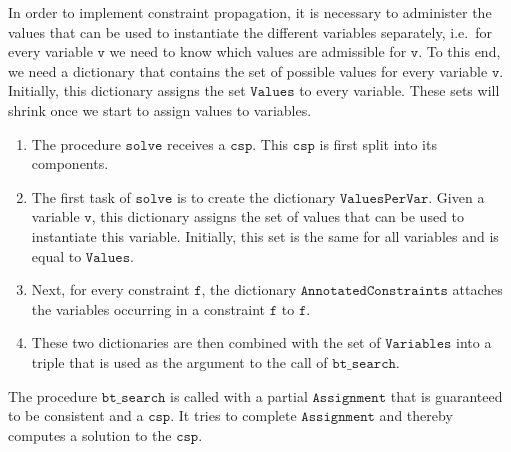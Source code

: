 In order to implement constraint propagation, it is necessary to administer the values that can be used
to instantiate the different variables separately, i.e.~for every variable $\mathtt{v}$ we need to know which
values are admissible for $\mathtt{v}$.  To this end, we need a dictionary that contains the set of possible
values for every variable $\mathtt{v}$.  Initially, this dictionary assigns the set $\mathtt{Values}$ to
every variable.  These sets will shrink once we start to assign values to variables.
\begin{enumerate}
\item The procedure $\mathtt{solve}$ receives a $\mathtt{csp}$.  This $\mathtt{csp}$ is first split into its
      components.
\item The first task of $\mathtt{solve}$ is to create the dictionary $\mathtt{ValuesPerVar}$.  
      Given a variable $\mathtt{v}$, this dictionary assigns the set of values that can be used to instantiate this
      variable.  Initially, this set is the same for all variables and is equal to $\mathtt{Values}$.
\item Next, for every constraint $\mathtt{f}$, the dictionary $\mathtt{AnnotatedConstraints}$ attaches the
      variables occurring in a constraint $\mathtt{f}$ to $\mathtt{f}$.
\item These two dictionaries are then combined with the set of $\mathtt{Variables}$ into a triple that is used
      as the argument to the call of $\mathtt{bt\_search}$.
\end{enumerate}
The procedure $\mathtt{bt\_search}$ is called with a partial $\mathtt{Assignment}$ that is guaranteed to be
consistent and a $\mathtt{csp}$.  It tries to complete $\mathtt{Assignment}$ and thereby computes a solution to the $\mathtt{csp}$.
